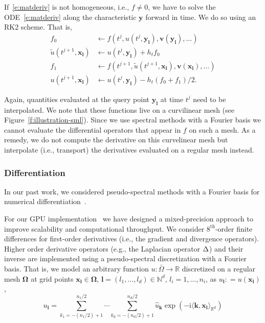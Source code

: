 \documentclass[11pt]{amsart}
\newcommand{\figref}[1]{Figure~\ref{#1}}
\newcommand\di[1]{\ensuremath{\mathbf{#1}}}
\newcommand{\ilap}{\rotatebox[origin=c]{180}{$\nabla$}}
\newcommand{\defeq}{\ensuremath{\mathrel{\mathop:}=}}
\renewcommand{\vec}[1]{\ensuremath{\boldsymbol{#1}}}
\begin{document}
If~\eqref{e:matderiv} is not homogeneous, i.e., $f \not = 0$, we have to solve the ODE~\eqref{e:matderiv} along the characteristic $\vec{y}$ forward in time. We do so using an RK2 scheme. That is,
\[
\begin{aligned}
f_0 & \gets f(t^j,u(t^j,\di{y}_{\vec{l}}), \di{v}(\di{y}_{\vec{l}}), \ldots) \\
\tilde{u}(t^{j+1},\di{x}_{\vec{l}}) & \gets u(t^j,\di{y}_{\vec{l}}) + h_t f_0 \\
f_1 & \gets f(t^{j+1},\tilde{u}(t^{j+1},\di{x}_{\vec{l}}), \di{v}(\di{x}_{\vec{l}}), \ldots) \\
u(t^{j+1},\di{x}_{\vec{l}}) & \gets u(t^j,\di{y}_{\vec{l}}) - h_t(f_0 + f_1) / 2.
\end{aligned}
\]

\noindent Again, quantities evaluated at the query point $\di{y}_{\vec{l}}$ at time $t^j$ need to be interpolated. We note that these functions live on a curvilinear mesh (see \figref{f:illustration-sml}). Since we use spectral methods with a Fourier basis we cannot evaluate the differential operators that appear in $f$ on such a mesh. As a remedy, we do not compute the derivative on this curvelinear mesh but interpolate (i.e., transport) the derivatives evaluated on a regular mesh instead.




\subsubsection{Differentiation}

In our past work, we considered pseudo-spectral methods with a Fourier basis for numerical differentiation~\cite{Mang:2015a,Mang:2017b,Mang:2016b,Mang:2019a}.

For our GPU implementation~\cite{Brunn:2020a,Brunn:2021a} we have designed a mixed-precision approach to improve scalability and computational throughput. We consider $8^{\text{th}}$-order finite differences for first-order derivatives (i.e., the gradient and divergence operators). Higher order derivative operators (e.g., the Laplacian operator $\ilap$) and their inverse are implemented using a pseudo-spectral discretization with a Fourier basis. That is, we model an arbitrary function $u : \bar{\Omega} \to \mathbb{R}$ discretized on a regular mesh $\di{\Omega}$ at grid points $\di{x}_{\vec{l}}\in \di{\Omega}$, $\vec{l} = (l_1, \ldots, l_d) \in \mathbb{N}^d$, $l_i = 1,\ldots, n_i$, as $u_{\vec{l}} \defeq u(\di{x}_{\vec{l}})$,
\[
u_{\vec{l}} =
\sum_{k_1= -(n_1/2) + 1}^{n_1/2} \cdots\sum_{k_d= -(n_d/2) + 1}^{n_d/2}
\hat{u}_{\vec{k}} \exp(- \text{i} \langle \vec{k}, \di{x}_{\vec{l}}\rangle_{\mathbb{R}^d})
\]
\end{document}
